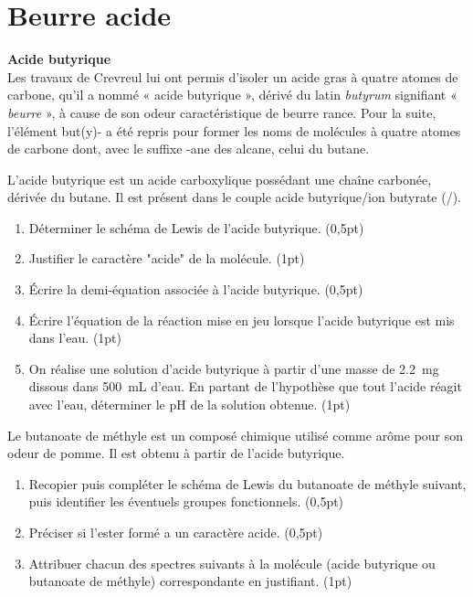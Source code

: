\documentclass[a4paper,11pt,fleqn]{article}%
\begin{document}
\maketitle

\section{Beurre acide}
\noindent \colorbox{red!10}{\begin{minipage}{.98\linewidth}
	\small
	\textbf{Acide butyrique}\\
	Les travaux de Crevreul lui ont permis d’isoler un acide gras à quatre atomes de carbone, qu’il a nommé « acide butyrique », dérivé du latin \textit{butyrum} signifiant « \textit{beurre} », à cause de son odeur caractéristique de beurre rance. Pour la suite, l’élément but(y)- a été repris pour former les noms de molécules à quatre atomes de carbone dont, avec le suffixe -ane des alcane, celui du butane.\\
\end{minipage}}

L’acide butyrique est un acide carboxylique possédant une chaîne carbonée, dérivée du butane. Il est présent dans le couple acide butyrique/ion butyrate (/).
\begin{enumerate}
	\item Déterminer le schéma de Lewis de l’acide butyrique. (0,5pt)
	\item Justifier le caractère "acide" de la molécule. (1pt)
	\item Écrire la demi-équation associée à l'acide butyrique. (0,5pt)
	\item Écrire l'équation de la réaction mise en jeu lorsque l'acide butyrique est mis dans l'eau. (1pt)
	\item On réalise une solution d'acide butyrique à partir d'une masse de \SI{2,2}{\milli\gram} dissous dans \SI{500}{\milli\liter} d'eau. En partant de l'hypothèse que tout l'acide réagit avec l'eau, déterminer le pH de la solution obtenue. (1pt)
\end{enumerate}
Le butanoate de méthyle  est un composé chimique utilisé comme arôme pour son odeur de pomme. Il est obtenu à partir de l’acide butyrique.
\begin{enumerate}[resume]
	\item Recopier puis compléter le schéma de Lewis du butanoate de méthyle suivant, puis identifier les éventuels groupes fonctionnels. (0,5pt)
	\item Préciser si l’ester formé a un caractère acide. (0,5pt)
	\item Attribuer chacun des spectres suivants à la molécule (acide butyrique ou butanoate de méthyle) correspondante en justifiant. (1pt)
\end{enumerate}
\end{document}
